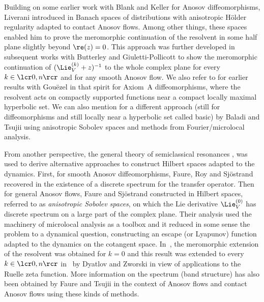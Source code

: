 Building on some earlier work \cite{BKL} with Blank and Keller for Anosov diffeomorphisms, Liverani introduced in \cite{liverani} Banach spaces of distributions with anisotropic Hölder regularity adapted to contact Anosov flows. Among other things, these spaces enabled him to prove the meromorphic continuation of the resolvent in some half plane slightly beyond $\re(z)=0$. This approach was further developed in subsequent works with Butterley \cite{butterley-liverani} and Giuletti-Pollicott \cite{GLP} to show the meromorphic continuation of $(\Lie_V^{(k)}+z)^{-1}$ to the whole complex plane for every $k\in\lcr0,n\rcr$ and for any smooth Anosov flow. We also refer to \cite{gouezel-liverani_2006, gouezel-liverani} for earlier results with Gouëzel in that spirit for Axiom~A diffeomorphisms, where the resolvent acts on compactly supported functions near a compact locally maximal hyperbolic set. We can also mention \cite{baladi-tsujii_2007} for a different approach (still for diffeomorphisms and still locally near a hyperbolic set called basic) by Baladi and Tsujii using anisotropic Sobolev spaces and methods from Fourier/microlocal analysis.

From another perspective, the general theory of semiclassical resonances \cite{DZ-book}, \cite{helffer-sjostrand} was used to derive alternative approaches to construct Hilbert spaces adapted to the dynamics. First, for smooth Anosov diffeomorphisms, Faure, Roy and Sjöstrand recovered in \cite{FRS} the existence of a discrete spectrum for the transfer operator. Then for general Anosov flows, Faure and Sjöstrand constructed in \cite{FS} Hilbert spaces, referred to as \textit{anisotropic Sobolev spaces}, on which the Lie derivative $\Lie_V^{(0)}$ has discrete spectrum on a large part of the complex plane. Their analysis used the machinery of microlocal analysis as a toolbox and it reduced in some sense the problem to a dynamical question, \ie constructing an escape (or Lyapunov) function adapted to the dynamics on the cotangent space. In~\cite{FS}, the meromorphic extension of the resolvent was obtained for $k = 0$ and this result was extended to every $k\in\lcr0,n\rcr$ in~\cite{dyatlov-zworski} by Dyatlov and Zworski in view of applications to the Ruelle zeta function. More information on the spectrum (\eg band structure) has also been obtained by Faure and Tsujii \cite{tsujii_2010,tsujii_2012, faure-tsujii2013,faure-tsujii2017,faure-tsujii2019,faure-tsujii2021} in the context of Anosov flows and contact Anosov flows using these kinds of methods.


